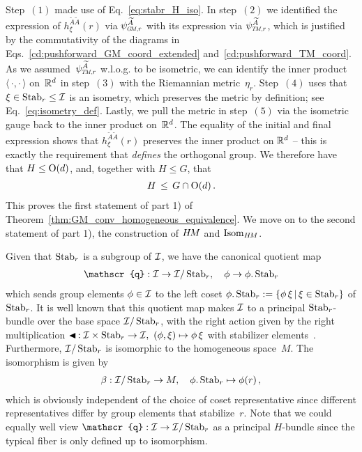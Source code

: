 Step~$(1)$ made use of Eq.~\eqref{eq:stabr_H_iso}.
In step~$(2)$ we identified the expression of $h_\xi^{\widetilde{A}\widetilde{A}}(r)$ via $\psiGMr^{\widetilde{A}}$ with its expression via $\psiTMr^{\widetilde{A}}$, which is justified by the commutativity of the diagrams in Eqs.~\eqref{cd:pushforward_GM_coord_extended} and~\eqref{cd:pushforward_TM_coord}.
As we assumed~$\psiTMr^{\widetilde{A}}$ w.l.o.g. to be isometric, we can identify the inner product $\langle\,\cdot,\cdot\,\rangle$ on~$\mathbb{R}^d$ in step~$(3)$ with the Riemannian metric~$\eta_r$.
Step~$(4)$ uses that $\xi \in \operatorname{Stab}_{r} \leq \mathcal{I}$ is an isometry, which preserves the metric by definition; see Eq.~\eqref{eq:isometry_def}.
Lastly, we pull the metric in step~$(5)$ via the isometric gauge back to the inner product on~$\mathbb{R}^d$.
The equality of the initial and final expression shows that $h_\xi^{\widetilde{A}\widetilde{A}}(r)$ preserves the inner product on $\mathbb{R}^d$ -- this is exactly the requirement that \emph{defines} the orthogonal group.
We therefore have that $H\leq \operatorname{O}(d)$, and, together with $H\leq G$, that
\begin{align}
    H \,\leq\, G \cap \operatorname{O}(d) \,.
\end{align}
This proves the first statement of part 1) of Theorem~\ref{thm:GM_conv_homogeneous_equivalence}.
We move on to the second statement of part 1), the construction of $H\mkern-2.5muM$ and $\operatorname{Isom}_{H\mkern-2.5muM}$.

Given that $\operatorname{Stab}_{r}$ is a subgroup of $\mathcal{I}$, we have the canonical quotient map
\begin{align}
    \mathscr{q}: \I \to \I/\Stab{r},\ \ \ \phi \to \phi.\Stab{r}
\end{align}
which sends group elements $\phi \in \mathcal{I}$ to the left coset $\phi.\operatorname{Stab}_{r} := \{\phi\,\xi \,|\, \xi\in\operatorname{Stab}_{r} \}$ of $\operatorname{Stab}_{r}$.
It is well known that this quotient map makes $\mathcal{I}$ to a principal $\operatorname{Stab}_{r}$-bundle over the base space $\mathcal{I}/\operatorname{Stab}_{r}$, with the right action given by the right multiplication $\blacktriangleleft \,: \I \times \Stab{r} \to \I,\ (\phi,\xi) \mapsto \phi\,\xi$ with stabilizer elements~\cite{gallier2019diffgeom2,neeb2010differential}.
Furthermore, $\mathcal{I}/\operatorname{Stab}_{r}$ is isomorphic to the homogeneous space~$M$.
The isomorphism is given by
\begin{align}
    \beta: \mathcal{I}/\operatorname{Stab}_{r} \to M,\ \ \ \phi.\operatorname{Stab}_{r} \mapsto \phi(r) \,,
\end{align}
which is obviously independent of the choice of coset representative since different representatives differ by group elements that stabilize~$r$.
Note that we could equally well view $\mathscr{q}: \I \to \I/\Stab{r}$ as a principal $H$-bundle since the typical fiber is only defined up to isomorphism.


